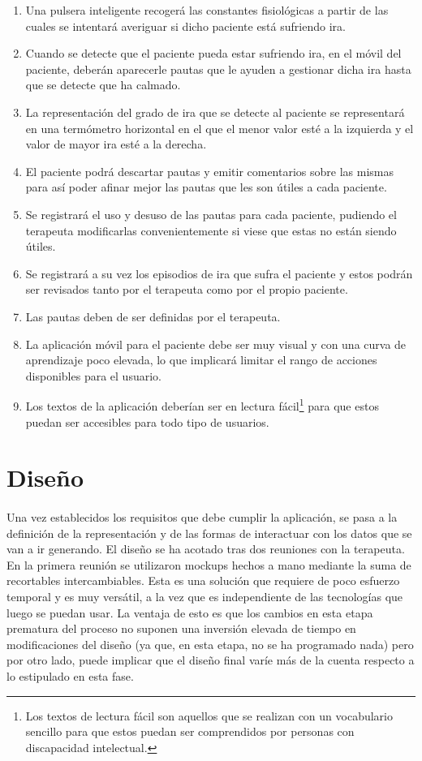 \begin{enumerate}
    \item Una pulsera inteligente recogerá las constantes fisiológicas a partir de las cuales se intentará averiguar si dicho paciente está sufriendo ira.
    \item Cuando se detecte que el paciente pueda estar sufriendo ira, en el móvil del paciente, deberán aparecerle pautas que le ayuden a gestionar dicha ira hasta que se detecte que ha calmado.
    \item La representación del grado de ira que se detecte al paciente se representará en una termómetro horizontal en el que el menor valor esté a la izquierda y el valor de mayor ira esté a la derecha.
    \item El paciente podrá descartar pautas y emitir comentarios sobre las mismas para así poder afinar mejor las pautas que les son útiles a cada paciente.
    \item Se registrará el uso y desuso de las pautas para cada paciente, pudiendo el terapeuta modificarlas convenientemente si viese que estas no están siendo útiles.
    \item Se registrará a su vez los episodios de ira que sufra el paciente y estos podrán ser revisados tanto por el terapeuta como por el propio paciente.
    \item Las pautas deben de ser definidas por el terapeuta.
    \item La aplicación móvil para el paciente debe ser muy visual y con una curva de aprendizaje poco elevada, lo que implicará limitar el rango de acciones disponibles para el usuario.
    \item Los textos de la aplicación deberían ser en lectura fácil\footnote{Los textos de lectura fácil son aquellos que se realizan con un vocabulario sencillo para que estos puedan ser comprendidos por personas con discapacidad intelectual.} para que estos puedan ser accesibles para todo tipo de usuarios.
\end{enumerate}

\section{Diseño}
\paragraph{}
Una vez establecidos los requisitos que debe cumplir la aplicación, se pasa a la definición de la representación y de las formas de interactuar con los datos que se van a ir generando. El diseño se ha acotado tras dos reuniones con la terapeuta. En la primera reunión se utilizaron mockups hechos a mano mediante la suma de recortables intercambiables. Esta es una solución que requiere de poco esfuerzo temporal y es muy versátil, a la vez que es independiente de las tecnologías que luego se puedan usar. La ventaja de esto es que los cambios en esta etapa prematura del proceso no suponen una inversión elevada de tiempo en modificaciones del diseño (ya que, en esta etapa, no se ha programado nada) pero por otro lado, puede implicar que el diseño final varíe más de la cuenta respecto a lo estipulado en esta fase.

